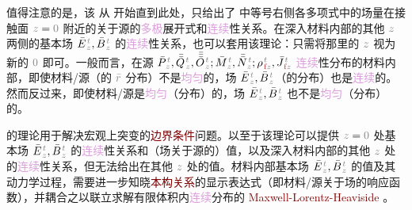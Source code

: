 值得注意的是，该  从  开始直到此处，只给出了  中等号右侧各多项式中的\textcolor{NavyBlue}{场量}在接触面 $\mathcolor{gray}{z \mathcolor{black}{=} 0}$ 附近的关于源的\textcolor{Plum}{多极}展开式和\textcolor{Plum}{连续}性关系。在深入材料内部的其他 $\mathcolor{gray}{z}$ 两侧的\textcolor{NavyBlue}{基本场} $\bar{E}^{\;\!\mathcolor{gray}{t}}_{\;\!\mathcolor{gray}{z}}, \bar{B}^{\;\!\mathcolor{gray}{t}}_{\;\!\mathcolor{gray}{z}}$ 的\textcolor{Plum}{连续}性关系，也可以套用该理论：只需将那里的 $\mathcolor{gray}{z}$ 视为新的 $\mathcolor{gray}{0}$ 即可。一般而言，在源 $\bar{P}^{\;\!\mathcolor{gray}{t}}_{\;\!\mathcolor{gray}{z}},\bar{\bar{Q}}^{\;\!\mathcolor{gray}{t}}_{\;\!\mathcolor{gray}{z}},\bar{\bar{\bar{O}}}^{\;\!\mathcolor{gray}{t}}_{\;\!\mathcolor{gray}{z}} ; \bar{M}^{\;\!\mathcolor{gray}{t}}_{\;\!\mathcolor{gray}{z}}, \bar{\bar{N}}^{\;\!\mathcolor{gray}{t}}_{\;\!\mathcolor{gray}{z}};{\rho}^{\;\!\mathcolor{gray}{t}}_{\;\!\textcolor{Maroon}{\text{f}}\mathcolor{gray}{z}}, \bar{J}^{\;\!\mathcolor{gray}{t}}_{\;\!\textcolor{Maroon}{\text{f}}\mathcolor{gray}{z}}$ \textcolor{Plum}{连续}性分布的材料内部，即使材料/源（的 $\mathcolor{gray}{\bar{r}}$ 分布）不是\textcolor{Plum}{均匀}的，场 $\bar{E}^{\;\!\mathcolor{gray}{t}}_{\;\!\mathcolor{gray}{z}}, \bar{B}^{\;\!\mathcolor{gray}{t}}_{\;\!\mathcolor{gray}{z}}$（的分布）也是\textcolor{Plum}{连续}的。然而反过来，即使材料/源是\textcolor{Plum}{均匀}（分布）的，场 $\bar{E}^{\;\!\mathcolor{gray}{t}}_{\;\!\mathcolor{gray}{z}}, \bar{B}^{\;\!\mathcolor{gray}{t}}_{\;\!\mathcolor{gray}{z}}$ 也不是\textcolor{Plum}{均匀}（分布）的。

 的理论用于解决宏观上突变的\textcolor{Maroon}{边界条件}问题。以至于该理论可以提供 $\mathcolor{gray}{z \mathcolor{black}{=} 0}$ 处\textcolor{NavyBlue}{基本场} $\bar{E}^{\;\!\mathcolor{gray}{t}}_{\;\!\mathcolor{gray}{z}}, \bar{B}^{\;\!\mathcolor{gray}{t}}_{\;\!\mathcolor{gray}{z}}$ 的\textcolor{Plum}{连续}性关系和（场关于源的）值，以及深入材料内部的其他 $\mathcolor{gray}{z}$ 处的\textcolor{Plum}{连续}性关系，但无法给出在其他 $\mathcolor{gray}{z}$ 处的值。材料内部\textcolor{NavyBlue}{基本场} $\bar{E}^{\;\!\mathcolor{gray}{t}}_{\;\!\mathcolor{gray}{z}}, \bar{B}^{\;\!\mathcolor{gray}{t}}_{\;\!\mathcolor{gray}{z}}$ 的值及其动力学过程，需要进一步知晓\textcolor{Maroon}{本构关系}的显示表达式（即材料/源关于场的响应函数）\cite{raabMultipoleTheoryElectromagnetism2004}，并耦合之以联立求解有限体积内\textcolor{Plum}{连续}分布\cite{landauCHAPTERXIELECTROMAGNETIC1984}的 \textcolor{Maroon}{Maxwell-Lorentz-Heaviside} 。

